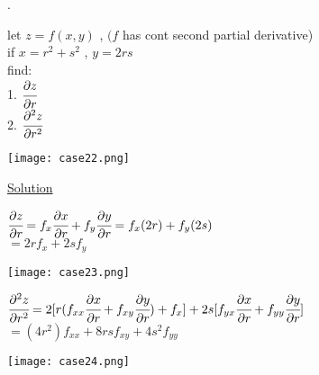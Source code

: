 \noindent{\color{smalt(darkpowderblue)}\rule{\linewidth}{.2mm}}
\begin{example}.\\
\noindent\begin{minipage}{0.5\textwidth}
let $z=f(x,y)$ , $(f$ has cont second partial derivative)\\
if $x=r^2+s^2$ , $y=2rs$\\
find:\\
1. $\cfrac{\partial z}{\partial r}$\\
2. $\cfrac{\partial^2z}{\partial r^2}$\\
\end{minipage}
\noindent\begin{minipage}{0.5\textwidth}
\begin{center}
   \texttt{[image: case22.png]}\\
\end{center}\end{minipage}
\underline{\color{smalt(darkpowderblue)}Solution}\\
\noindent\begin{minipage}{0.5\textwidth}
$\cfrac{\partial z}{\partial r}=f_x\cfrac{\partial x}{\partial r}+f_y\cfrac{\partial y}{\partial r}=f_x(2r)+f_y(2s)$\\
$=2rf_x+2sf_y$\\
\end{minipage}
\noindent\begin{minipage}{0.5\textwidth}
\begin{center}
   \texttt{[image: case23.png]}\\
\end{center}\end{minipage}
\noindent\begin{minipage}{0.5\textwidth}
$\cfrac{\partial^2 z}{\partial r^2}=2[r(f_{xx}\cfrac{\partial x}{\partial r}+f_{x y}\cfrac{\partial y}{\partial r})+f_x]+2s[f_{y x}\cfrac{\partial x}{\partial r}+f_{y y}\cfrac{\partial y}{\partial r}]$\\
$=(4r^2)f_{xx}+8rs f_{x y}+4s^2f_{y y}$\\
\end{minipage}
\noindent\begin{minipage}{0.5\textwidth}
\begin{center}
   \texttt{[image: case24.png]}\\
\end{center}\end{minipage}
\end{example}
